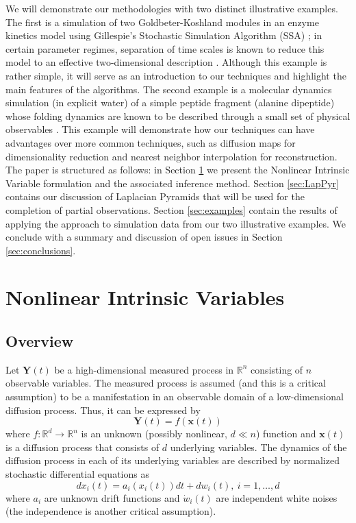 \documentclass[aip,jcp,preprint]{revtex4-1}
\begin{document}
We will demonstrate our methodologies with two distinct illustrative examples.
%
The first is a simulation
of two Goldbeter-Koshland modules in an enzyme kinetics model using Gillespie's Stochastic Simulation
Algorithm (SSA) \cite{gillespie1977exact};
in certain parameter regimes, separation of time scales is known
to reduce this model to an effective two-dimensional description \cite{zagaris2012stability}.
%
Although this example is rather simple, it will serve as an introduction to our techniques and highlight the main features of the algorithms.
%
The second example is a molecular dynamics
simulation (in explicit water) of a simple peptide fragment (alanine dipeptide) whose folding
dynamics are known to be described through a small set of physical observables \cite{bolhuis2000reaction}.
%
This example will demonstrate how our techniques can have advantages over more common techniques,
such as diffusion maps for dimensionality reduction
and nearest neighbor interpolation for reconstruction.
%
The paper is structured as follows: in Section \ref{sec:NIV} we present the Nonlinear Intrinsic Variable formulation and
the associated inference method.
%
Section \ref{sec:LapPyr} contains our discussion of Laplacian Pyramids that
will be used for the completion of partial observations.
%
Section \ref{sec:examples} contain the results
of applying the approach to simulation data from our two illustrative examples.
%
We conclude with
a summary and discussion of open issues in Section \ref{sec:conclusions}.

\section{Nonlinear Intrinsic Variables} \label{sec:NIV}

\subsection{Overview}
Let $\mathbf{Y}(t)$ be a high-dimensional measured process in $\mathbb{R}^n$ consisting of $n$ observable variables.
%
The measured process is assumed (and this is a critical assumption) to be a manifestation in an observable domain of a low-dimensional diffusion process. Thus, it can be expressed by
\begin{equation}
	\mathbf{Y}(t) = f(\mathbf{x}(t))
\end{equation}
where $f:\mathbb{R}^d \rightarrow \mathbb{R}^n$ is an unknown (possibly nonlinear, $d \ll n$) function and $\mathbf{x}(t)$ is a diffusion process that consists of $d$ underlying variables.
%
The dynamics of the diffusion process in each of its underlying variables are described by normalized stochastic differential equations as
\begin{equation}
	d x_i(t) = a_i (x_i(t)) dt + d w_i(t), \ i=1,\ldots,d
\end{equation}
where $a_i$ are unknown drift functions and $\dot{w}_i(t)$ are independent white noises (the independence is another critical assumption).
\end{document}
